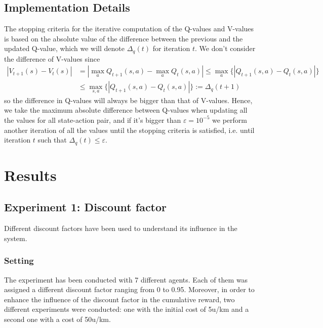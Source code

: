 \documentclass[11pt]{article}
\begin{document}
\subsection{Implementation Details}
The stopping criteria for the iterative computation of the Q-values and V-values is based on the absolute value of the difference between the previous and the updated Q-value, which we will denote $\Delta_q(t)$ for iteration $t$. We don't consider the difference of V-values since
\begin{align*}
    |V_{t+1}(s) - V_{t}(s)| &= |\max_a Q_{t+1}(s,a) - \max_a Q_{t}(s,a) | \leq \max_a \{|Q_{t+1}(s,a) - Q_{t}(s,a)|\} \\
    &\leq \max_{s,a} \{|Q_{t+1}(s,a) - Q_{t}(s,a)|\} := \Delta_q(t+1)
\end{align*}
so the difference in Q-values will always be bigger than that of V-values. Hence, we take the maximum absolute difference between Q-values when updating all the values for all state-action pair, and if it's bigger than $\varepsilon=10^{-5}$ we perform another iteration of all the values until the stopping criteria is satisfied, i.e. until iteration $t$ such that $\Delta_q(t) \leq \varepsilon$.

\section{Results}

\subsection{Experiment 1: Discount factor}
Different discount factors have been used to understand its influence in the system. 

\subsubsection{Setting}
The experiment has been conducted with 7 different agents. Each of them was assigned a different discount factor ranging from 0 to 0.95. Moreover, in order to enhance the influence of the discount factor in the cumulative reward, two different experiments were conducted: one with the initial cost of 5u/km and a second one with a cost of 50u/km. 
\end{document}
